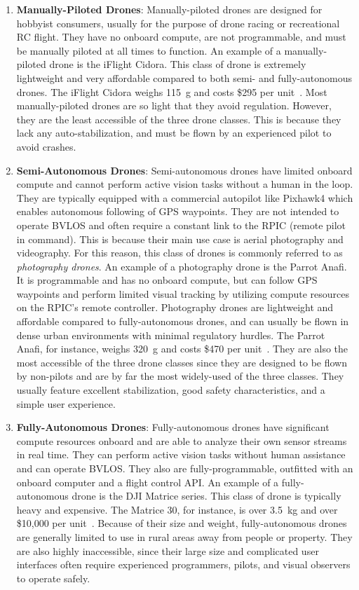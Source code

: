\begin{enumerate}
    \item \textbf{Manually-Piloted Drones}: Manually-piloted drones are designed for hobbyist consumers, usually for the purpose of drone racing or recreational RC flight. They have no onboard compute, are not programmable, and must be manually piloted at all times to function. An example of a manually-piloted drone is the iFlight Cidora. This class of drone is extremely lightweight and very affordable compared to both semi- and fully-autonomous drones. The iFlight Cidora weighs 115~g and costs \$295 per unit~\cite{Cidora}. Most manually-piloted drones are so light that they avoid regulation. However, they are the least accessible of the three drone classes. This is because they lack any auto-stabilization, and must be flown by an experienced pilot to avoid crashes.
    \item \textbf{Semi-Autonomous Drones}: Semi-autonomous drones have limited onboard compute and cannot perform active vision tasks without a human in the loop. They are typically equipped with a commercial autopilot like Pixhawk4 which enables autonomous following of GPS waypoints. They are not intended to operate BVLOS and often require a constant link to the RPIC (remote pilot in command). This is because their main use case is aerial photography and videography. For this reason, this class of drones is commonly referred to as \textit{photography drones}. An example of a photography drone is the Parrot Anafi. It is programmable and has no onboard compute, but can follow GPS waypoints and perform limited visual tracking by utilizing compute resources on the RPIC's remote controller. Photography drones are lightweight and affordable compared to fully-autonomous drones, and can usually be flown in dense urban environments with minimal regulatory hurdles. The Parrot Anafi, for instance, weighs 320~g and costs \$470 per unit~\cite{ParrotAnafi}. They are also the most accessible of the three drone classes since they are designed to be flown by non-pilots and are by far the most widely-used of the three classes. They usually feature excellent stabilization, good safety characteristics, and a simple user experience. 
    \item \textbf{Fully-Autonomous Drones}: Fully-autonomous drones have significant compute resources onboard and are able to analyze their own sensor streams in real time. They can perform active vision tasks without human assistance and can operate BVLOS. They also are fully-programmable, outfitted with an onboard computer and a flight control API. An example of a fully-autonomous drone is the DJI Matrice series. This class of drone is typically heavy and expensive. The Matrice 30, for instance, is over 3.5~kg and over \$10,000 per unit~\cite{Matrice30T}. Because of their size and weight, fully-autonomous drones are generally limited to use in rural areas away from people or property. They are also highly inaccessible, since their large size and complicated user interfaces often require experienced programmers, pilots, and visual observers to operate safely. 
\end{enumerate}
